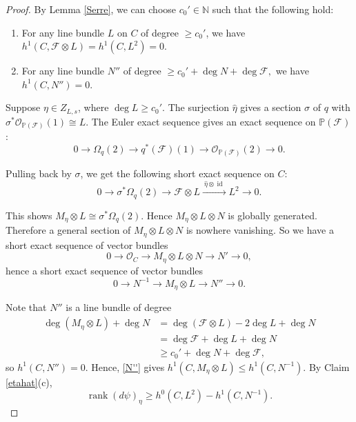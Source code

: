 \documentclass[11pt,letterpaper]{amsart}
\begin{document}
\begin{proof}
By Lemma \ref{Serre}, we can choose $c_0'\in\mathbb{N}$ such that the following hold:

\begin{enumerate}
\item For any line bundle $L$ on $C$ of degree $\ge c_0'$, we have
$h^1(C,\mathcal{F}\otimes L)=h^1(C,L^2)=0$.

\item For any line bundle $N''$ of degree $\ge c_0'+\deg N+\deg\mathcal{F},$
we have $h^1(C,N'')=0$.
\end{enumerate}



Suppose $\eta\in Z_{L,s}$, where $\deg L\ge c_0'$. The surjection
$\widehat{\eta}$ gives a section $\sigma$ of $q$ with $\sigma^*\mathcal{O}_{\mathbb{P}(\mathcal{F})}(1)\cong L$. The Euler exact sequence
gives an exact sequence on $\mathbb{P}(\mathcal{F})$:
\[
0\longrightarrow \Omega_q(2)\longrightarrow q^*(\mathcal{F})(1)\longrightarrow \mathcal{O}_{\mathbb{P}(\mathcal{F})}(2)\longrightarrow 0.
\]

Pulling back by $\sigma$, we get the following short exact sequence on $C$:
\[
0\longrightarrow \sigma^*\Omega_q(2)\longrightarrow
\mathcal{F}\otimes L
\xrightarrow{\ \widehat{\eta}\otimes\operatorname{id}\ }
L^2
\longrightarrow 0.
\]

This shows $M_\eta\otimes L\cong\sigma^*\Omega_q(2)$. Hence $M_\eta\otimes L\otimes N$ is globally generated. Therefore a general section of $M_\eta\otimes L\otimes N$ is nowhere vanishing. So we have a short exact sequence of vector bundles
\[
0\longrightarrow \mathcal{O}_C
\longrightarrow
M_\eta\otimes L\otimes N
\longrightarrow
N'
\longrightarrow 0,
\]
hence a short exact sequence of vector bundles
\begin{equation}\label{N''}
0\longrightarrow N^{-1}
\longrightarrow
M_\eta\otimes L
\longrightarrow
N''
\longrightarrow 0.
\end{equation}

Note that $N''$ is a line bundle of degree
\begin{align*}
\deg(M_\eta\otimes L)+\deg N
&=
\deg(\mathcal{F}\otimes L)-2\deg L+\deg N\\
&=
\deg\mathcal{F}+\deg L+\deg N\\
&\ge
c_0'+\deg N+\deg\mathcal{F},
\end{align*}
so $h^1(C,N'')=0$. Hence, \eqref{N''} gives
$h^1(C,M_\eta\otimes L)\le h^1(C,N^{-1})$. By Claim \ref{etahat}(c),
\[
\operatorname{rank}(d\psi)_\eta
\ge
h^0(C,L^2)-h^1(C,N^{-1}).
\]



\end{proof}
\end{document}
